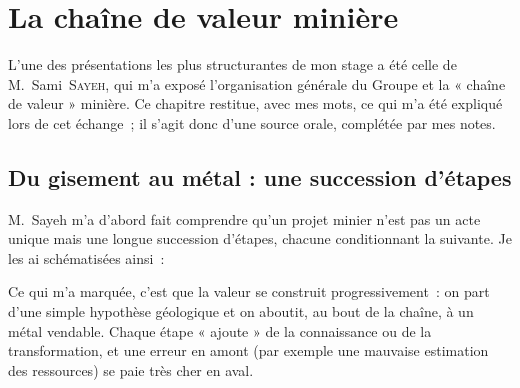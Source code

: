 \chapter{La chaîne de valeur minière}
\label{chap:chaine}

L'une des présentations les plus structurantes de mon stage a été celle de M.~Sami~\textsc{Sayeh}, qui m'a exposé l'organisation générale du Groupe et la « chaîne de valeur » minière. Ce chapitre restitue, avec mes mots, ce qui m'a été expliqué lors de cet échange~; il s'agit donc d'une source orale, complétée par mes notes.

\section{Du gisement au métal : une succession d'étapes}

M.~Sayeh m'a d'abord fait comprendre qu'un projet minier n'est pas un acte unique mais une longue succession d'étapes, chacune conditionnant la suivante. Je les ai schématisées ainsi~:

\begin{center}
\label{fig:chaine}
\end{center}

Ce qui m'a marquée, c'est que la valeur se construit progressivement~: on part d'une simple hypothèse géologique et on aboutit, au bout de la chaîne, à un métal vendable. Chaque étape « ajoute » de la connaissance ou de la transformation, et une erreur en amont (par exemple une mauvaise estimation des ressources) se paie très cher en aval.

